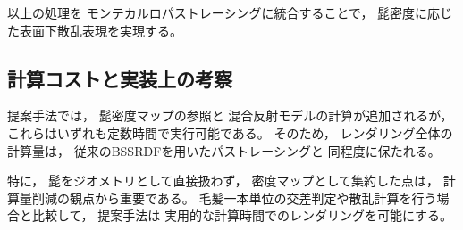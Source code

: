 以上の処理を
モンテカルロパストレーシングに統合することで，
髭密度に応じた表面下散乱表現を実現する。
\subsection{計算コストと実装上の考察}
提案手法では，
髭密度マップの参照と
混合反射モデルの計算が追加されるが，
これらはいずれも定数時間で実行可能である。
そのため，
レンダリング全体の計算量は，
従来のBSSRDFを用いたパストレーシングと
同程度に保たれる。

特に，
髭をジオメトリとして直接扱わず，
密度マップとして集約した点は，
計算量削減の観点から重要である。
毛髪一本単位の交差判定や散乱計算を行う場合と比較して，
提案手法は
実用的な計算時間でのレンダリングを可能にする。
